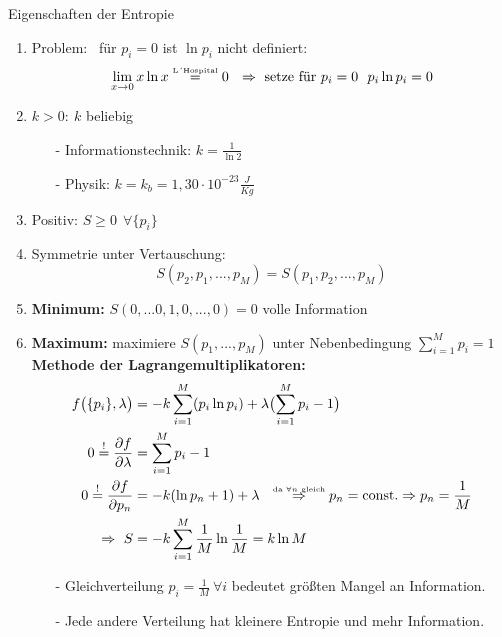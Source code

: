 \begin{prop}{Eigenschaften der Entropie}
\begin{enumerate}
    \item Problem: \ für $p_i =0$ ist $\ln{p_i}$ nicht definiert:
    \begin{equation*}
        \lim _{x \rightarrow 0} x \ln{x} \overset{\text{\tiny{L´Hospital}}}{=} 0 \ \ \Rightarrow \text{ setze für } p_i = 0 \ \ p_i \ln{p_i} = 0
    \end{equation*}
    \item $k > 0: \ k$ beliebig
    \begin{itemize}
        \item[-] Informationstechnik: $k = \frac{1}{\ln{2}}$
        \item[-] Physik: $k= k_b = 1,30 \cdot 10^{-23} \frac{J}{Kg}$
    \end{itemize}
    \item Positiv: $S \geq 0 \ \ \forall \{p_i\}$
    \item Symmetrie unter Vertauschung:
    \begin{equation*}
        S(p_2,p_1, ...,p_M) = S(p_1,p_2, ...,p_M)
    \end{equation*}
    \item \textbf{Minimum:} $S(0, ...0, 1, 0, ...,0) = 0$ volle Information
    \item \textbf{Maximum:} maximiere $S(p_1, ..., p_M)$ unter Nebenbedingung $\sum_{i=1}^M p_i = 1$ \\
    \textbf{Methode der Lagrangemultiplikatoren:}\label{lagrange}
    \begin{align}\label{Geichverteilung}
         f\bigl(\{p_i\}, \lambda\bigr) &= -k \sum_{i=1}^M  (p_i \ln{p_i} ) + \lambda \bigl(\sum_{i=1}^M p_i -1 \bigr)\\
         0 \overset{!}{=}\frac{\partial f}{\partial \lambda} &= \sum_{i=1}^M p_i-1 \\
         0 \overset{!}{=}\frac{\partial f}{\partial p_n} &= -k (\ln{p_n}+1) + \lambda \ \ \overset{\text{\tiny{da $\forall n$ gleich}}}{\Rightarrow} p_n = \text{const.} \Rightarrow p_n = \frac{1}{M}\\
         \Rightarrow \ S &= -k \sum_{i=1}^M \frac{1}{M} \ln{\frac{1}{M}} = k \ln{M}
    \end{align}
    \begin{itemize}
        \item[-] Gleichverteilung $p_i = \frac{1}{M} \ \forall i$ bedeutet größten Mangel an Information.
        \item[-] Jede andere Verteilung hat kleinere Entropie und mehr Information.

\end{itemize}
\end{enumerate}
\end{prop}
